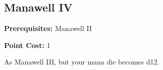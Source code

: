 \subsection*{Manawell IV}\label{feat:manawell4}

\noindent
\textbf{Prerequisites:} Manawell II

\noindent
\textbf{Point Cost:} 1 

As Manawell III, but your mana die becomes d12.
